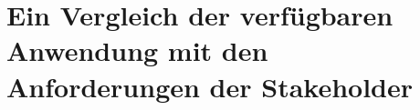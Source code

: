 \FloatBarrier
\section{Ein Vergleich der verfügbaren Anwendung mit den Anforderungen der Stakeholder}

